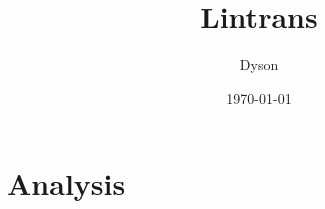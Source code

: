\documentclass[a4paper]{article}
\title{\Huge{Lintrans}}
\author{\Large{Dyson}}
\date{\Large{\today}}
\begin{document}
\maketitle
\tableofcontents
\newpage

\section{Analysis}


\printbibliography
\end{document}
